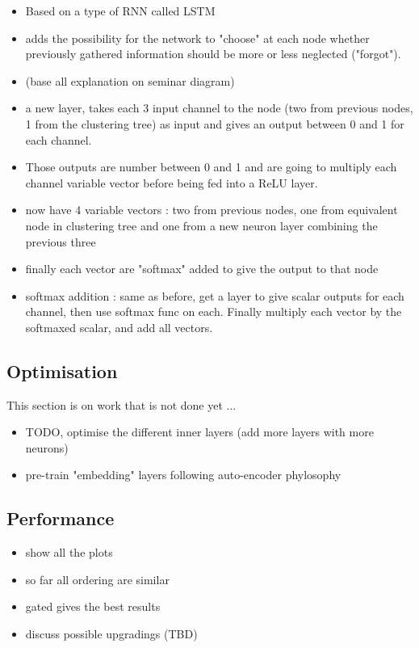 \begin{itemize}
    \item Based on a type of RNN called LSTM
    \item adds the possibility for the network to "choose" at each node whether previously gathered information should be more or less neglected ("forgot").
    \item (base all explanation on seminar diagram)
    \item a new layer, takes each 3 input channel to the node (two from previous nodes, 1 from the clustering tree) as input and gives an output between 0 and 1 for each channel.
    \item Those outputs are number between 0 and 1 and are going to multiply each channel variable vector before being fed into a ReLU layer.
    \item now have 4 variable vectors : two from previous nodes, one from equivalent node in clustering tree and one from a new neuron layer combining the previous three
    \item finally each vector are "softmax" added to give the output to that node
    \item softmax addition : same as before, get a layer to give scalar outputs for each channel, then use softmax func on each. Finally multiply each vector by the softmaxed scalar, and add all vectors.
\end{itemize}



\subsection{Optimisation}

This section is on work that is not done yet ...

\begin{itemize}
    \item TODO, optimise the different inner layers (add more layers with more neurons)
    \item pre-train "embedding" layers following auto-encoder phylosophy
\end{itemize}

\subsection{Performance}

\begin{itemize}
    \item show all the plots
    \item so far all ordering are similar
    \item gated gives the best results
    \item discuss possible upgradings (TBD)
\end{itemize}